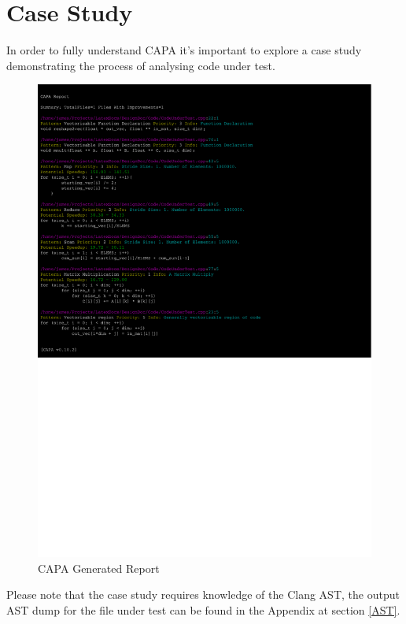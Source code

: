 
\section{Case Study}\label{caseStudy} %
In order to fully understand CAPA it's important to explore a case study demonstrating the process
of analysing code under test.

\begin{figure}[H]
\includegraphics[clip, trim=0cm 12.7cm 6cm 0.5cm, width=\textwidth]{./Misc/report.pdf}
\caption{CAPA Generated Report}
\end{figure}
Please note that the case study requires knowledge of the Clang AST, the output AST dump for the file
under test can be found in the Appendix at section \ref{AST}.

